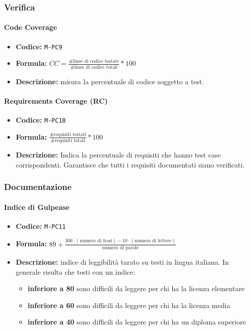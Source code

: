 \documentclass[a4paper,12pt]{article}
\begin{document}
\subsubsection{Verifica}
\paragraph{Code Coverage}
\begin{itemize}
    \item \textbf{Codice:} \texttt{M-PC9}
    \item \textbf{Formula:} $CC=\frac{\text{\# linee di codice testate}}{\text{\# linee di codice totali}}*100$
    \item \textbf{Descrizione:} misura la percentuale di codice soggetto a test. 
\end{itemize}

\paragraph{Requirements Coverage (RC)}
\begin{itemize}
    \item \textbf{Codice:} \texttt{M-PC10}
    \item \textbf{Formula:} $\frac{\text{\# requisiti testati}}{\text{\# requisiti totali}}*100$
    \item \textbf{Descrizione:} Indica la percentuale di requisiti che hanno test case corrispondenti. Garantisce che tutti i requisiti documentati siano verificati.
\end{itemize}

\subsubsection{Documentazione}
\paragraph{Indice di Gulpease}
\begin{itemize}
    \item \textbf{Codice:} \texttt{M-PC11}
    \item \textbf{Formula:} $89 + \frac{300 \cdot (\text{numero di frasi}) - 10 \cdot (\text{numero di lettere})}{\text{numero di parole}}$
    \item \textbf{Descrizione:} indice di leggibilità tarato su testi in lingua italiana. In generale risulta che testi con un indice:
    \begin{itemize}
        \item \textbf{inferiore a 80} sono difficili da leggere per chi ha la licenza elementare
        \item \textbf{inferiore a 60} sono difficili da leggere per chi ha la licenza media
        \item \textbf{inferiore a 40} sono difficili da leggere per chi ha un diploma superiore
    \end{itemize}
\end{itemize}
\end{document}
